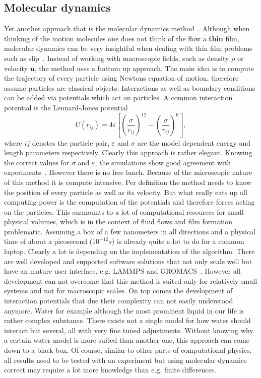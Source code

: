 \subsection{Molecular dynamics}
Yet another approach that is the molecular dynamics method~\cite{haile1992molecular, PhysRevE.100.023108, doi:10.1063/1.1290698}.
Although when thinking of the motion molecules one does not think of the flow a \textbf{thin} film, molecular dynamics can be very insightful when dealing with thin film problems such as slip~\cite{jabbarzadeh1999wall, sega2013regularization}. 
Instead of working with macroscopic fields, such as density $\rho$ or velocity $\mathbf{u}$, the method uses a bottom up approach.
The main idea is to compute the trajectory of every particle using Newtons equation of motion, therefore assume particles are classical objects.
Interactions as well as boundary conditions can be added via potentials which act on particles.
A common interaction potential is the Lennard-Jones potential
\begin{equation}\label{eq:Len-Jon}
    U(r_{ij}) = 4\varepsilon\left[\left(\frac{\sigma}{r_{ij}}\right)^{12}-\left(\frac{\sigma}{r_{ij}}\right)^6\right],
\end{equation}
where $ij$ denotes the particle pair, $\varepsilon$ and $\sigma$ are the model dependent energy and length parameters respectively.
Clearly this approach is rather elegant.
Knowing the correct values for $\sigma$ and $\varepsilon$, the simulations show good agreement with experiments~\cite{PhysRevE.100.023108}.
However there is no free lunch. 
Because of the microscopic nature of this method it is compute intensive.
Per definition the method needs to know the position of every particle as well as its velocity.
But what really eats up all computing power is the computation of the potentials and therefore forces acting on the particles.
This surmounts to a lot of computational resources for small physical volumes, which is in the context of fluid flows and film formation problematic.
Assuming a box of a few nanometers in all directions and a physical time of about a picosecond ($10^{-12}s$) is already quite a lot to do for a common laptop.
Clearly a lot is depending on the implementation of the algorithm. 
There are well developed and supported software solutions that not only scale well but have an mature user interface, e.g. LAMMPS and GROMACS~\cite{PLIMPTON19951, BERENDSEN199543, lindahl2001gromacs}.  
However all development can not overcome that this method is suited only for relatively small systems and not for macroscopic scales.
On top comes the development of interaction potentials that due their complexity can not easily understood anymore.
Water for example although the most prominent liquid in our life is rather complex substance.
There exists not a single model for how water should interact but several, all with very fine tuned adjustments.
Without knowing why a certain water model is more suited than another one, this approach can come down to a black box.
Of course, similar to other parts of computational physics, all results need to be tested with an experiment but using molecular dynamics correct may require a lot more knowledge than e.g. finite differences.


